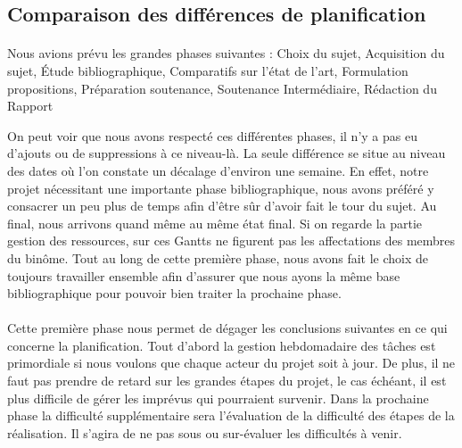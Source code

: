 \documentclass[11pt, french,screen]{report-rd-info}
\begin{document}
\subsection{Comparaison des différences de planification}
\paragraph*{}
Nous avions prévu les grandes phases suivantes : Choix du sujet, Acquisition du sujet, Étude bibliographique, Comparatifs sur l'état de l'art, Formulation propositions, Préparation soutenance, Soutenance Intermédiaire, Rédaction du Rapport

On peut voir que nous avons respecté ces différentes phases, il n’y a pas eu d’ajouts ou de suppressions à ce niveau-là. La seule différence se situe au niveau des dates où l’on constate un décalage d’environ une semaine. En effet, notre projet nécessitant une importante phase bibliographique, nous avons préféré y consacrer un peu plus de temps afin d’être sûr d’avoir fait le tour du sujet. Au final, nous arrivons quand même au même état final. Si on regarde la partie gestion des ressources, sur ces Gantts ne figurent pas les affectations des membres du binôme. Tout au long de cette première phase, nous avons fait le choix de toujours travailler ensemble afin d’assurer que nous ayons la même base bibliographique pour pouvoir bien traiter la prochaine phase.

\paragraph*{}
Cette première phase nous permet de dégager les conclusions suivantes en ce qui concerne la planification. Tout d’abord la gestion hebdomadaire des tâches est primordiale si nous voulons que chaque acteur du projet soit à jour. De plus, il ne faut pas prendre de retard sur les grandes étapes du projet, le cas échéant, il est plus difficile de gérer les imprévus qui pourraient survenir. Dans la prochaine phase la difficulté supplémentaire sera l’évaluation de la difficulté des étapes de la réalisation. Il s’agira de ne pas sous ou sur-évaluer les difficultés à venir.
\end{document}
